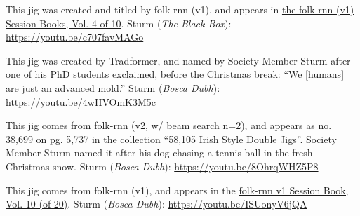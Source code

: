 \documentclass[a4paper,notitlepage,twoside]{book}
\begin{document}
{}
\hypertarget{jig:CunningStorm}{}
This jig was created and titled by folk-rnn (v1),
and appears in \href{https://highnoongmt.wordpress.com/2018/01/05/volumes-1-20-of-folk-rnn-v1-transcriptions}{the folk-rnn (v1) Session Books, Vol. 4 of 10}.
Sturm ({\em The Black Box}): \url{https://youtu.be/c707favMAGo}

{}
\hypertarget{jig:mold}{}
This jig was created by Tradformer, and named by Society Member Sturm
after one of his PhD students exclaimed, before the Christmas break:
``We [humans] are just an advanced mold.''
Sturm ({\em Bosca Dubh}): \url{https://youtu.be/4wHVOmK3M5c}

{}
\hypertarget{jig:chasingballs}{}
This jig comes from folk-rnn (v2, w/ beam search n=2),
and appears as no. 38,699 on pg. 5,737 in the collection
\href{http://urn.kb.se/resolve?urn=urn:nbn:se:kth:diva-296578}{``58,105 Irish Style Double Jigs''}.
Society Member Sturm named it after his dog chasing a tennis ball in the fresh Christmas snow.
Sturm ({\em Bosca Dubh}): \url{https://youtu.be/8OhrqWHZ5P8}

{}
\hypertarget{jig:OptolyLouden}{}
This jig comes from folk-rnn (v1), 
and appears in the \href{https://highnoongmt.wordpress.com/2018/01/05/volumes-1-20-of-folk-rnn-v1-transcriptions/}{folk-rnn v1 Session Book, Vol. 10 (of 20)}.
Sturm ({\em Bosca Dubh}): \url{https://youtu.be/ISUonyV6jQA}




\clearpage
\end{document}

